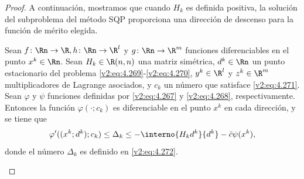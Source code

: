 \begin{proof}
A continuación, mostramos que cuando $H_k$ es definida positiva, la solución del subproblema del método SQP proporciona una dirección de descenso para la función de mérito elegida.

\begin{lemma}\label{v2:lem:4.6.1}
Sean $f \colon \Rn \to \R, h \colon \Rn \to \R^l$ y $g \colon \Rn \to \R^m$ funciones diferenciables en el punto $x^k \in \Rn$. Sean $H_k \in \R(n,n)$ una matriz simétrica, $d^k \in \Rn$ un punto estacionario del problema \eqref{v2:eq:4.269}-\eqref{v2:eq:4.270}, $y^k \in \R^l$ y $z^k \in \R^m$ multiplicadores de Lagrange asociados, y $c_k$ un número que satisface \eqref{v2:eq:4.271}. Sean $\varphi$ y $\psi$ funciones definidas por \eqref{v2:eq:4.267} y \eqref{v2:eq:4.268}, respectivamente.
Entonces la función $\varphi(\cdot; c_k)$ es diferenciable en el punto $x^k$ en cada dirección, y se tiene que
\begin{equation}
\varphi'((x^k; d^k); c_k) \le \Delta_k \le -\interno{H_k d^k}{d^k} - \bar{c}\psi(x^k),
\label{v2:eq:4.274}
\end{equation}
donde el número $\Delta_k$ es definido en \eqref{v2:eq:4.272}.
\end{lemma}


\end{proof}
